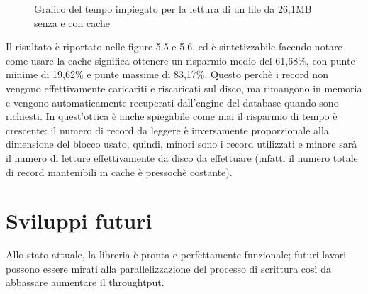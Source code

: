 \begin{figure}
\centering
{}
\caption{Grafico del tempo impiegato per la lettura di un file da 26,1MB senza e con cache}
\label{:}
\end{figure}

Il risultato è riportato nelle figure 5.5 e 5.6, ed è sintetizzabile facendo notare come usare la cache significa ottenere un risparmio medio del 61,68\%, con punte minime di 19,62\% e punte massime di 83,17\%. Questo perchè i record non vengono effettivamente caricariti e riscaricati sul disco, ma rimangono in memoria e vengono automaticamente recuperati dall'engine del database quando sono richiesti. In quest'ottica è anche spiegabile come mai il risparmio di tempo è crescente: il numero di record da leggere è inversamente proporzionale alla dimensione del blocco usato, quindi, minori sono i record utilizzati e minore sarà il numero di letture effettivamente da disco da effettuare (infatti il numero totale di record mantenibili in cache è pressochè costante).

\section{Sviluppi futuri}
Allo stato attuale, la libreria è pronta e perfettamente funzionale; futuri lavori possono essere mirati alla parallelizzazione del processo di scrittura così da abbassare aumentare il throughtput.